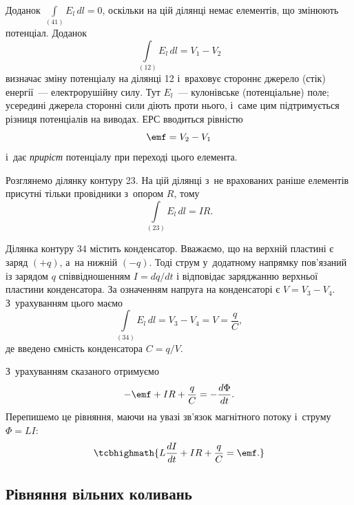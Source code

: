 Доданок $\int\limits_{(41)} E_l \, dl = 0$, оскільки на цій ділянці немає елементів, що
змінюють потенціал. Доданок
\begin{equation*}
	\int\limits_{(12)} E_l \, dl = V_1 - V_2
\end{equation*}
визначає зміну потенціалу на ділянці 12 і~враховує стороннє
джерело (стік) енергії~--- електрорушійну силу. Тут $E_l$~--- кулонівське (потенціальне) поле; усередині джерела сторонні сили діють проти нього, і~саме цим підтримується різниця потенціалів на виводах. ЕРС вводиться
рівністю
\begin{equation*}
	\emf = V_2 - V_1
\end{equation*}
і~дає \emph{приріст} потенціалу при переході цього елемента.

Розглянемо ділянку контуру 23. На цій ділянці з~не врахованих
раніше елементів присутні тільки провідники з~опором $R$, тому
\begin{equation*}
	\int\limits_{(23)} E_l \, dl = IR.
\end{equation*}

Ділянка контуру 34 містить конденсатор. Вважаємо, що на верхній
пластині є заряд $(+q)$, а~на нижній $(-q)$. Тоді струм у~додатному
напрямку пов'язаний із зарядом $q$ співвідношенням $I = dq/dt$ і
відповідає заряджанню верхньої пластини конденсатора. За означенням
напруга на конденсаторі є $V = V_3 - V_4$. З~урахуванням цього маємо
\begin{equation*}
	\int\limits_{(34)} E_l \, dl = V_3 - V_4 = V = \frac{q}{C},
\end{equation*}
де введено ємність конденсатора $C = q/V$.

З~урахуванням сказаного отримуємо
\begin{equation}\label{eq:circuit_equation_raw}
	-\emf + IR + \frac{q}{C} = -\frac{d\Phi}{dt}.
\end{equation}
Перепишемо це рівняння, маючи на увазі зв'язок магнітного потоку і~струму
$\Phi = LI$:
\begin{equation}\label{eq:circuit_equation}
	\tcbhighmath{
		L\frac{dI}{dt} + IR + \frac{q}{C} = \emf.
	}
\end{equation}

\subsection*{Рівняння вільних коливань}

